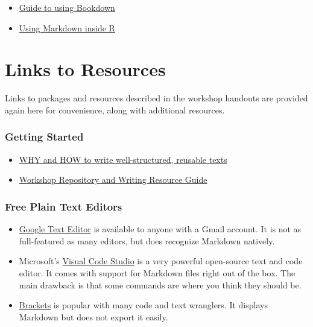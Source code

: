 \documentclass[
]{article}
\providecommand{\tightlist}{%
  \setlength{\itemsep}{0pt}\setlength{\parskip}{0pt}}
\begin{document}
\begin{itemize}
\tightlist
\item
  \href{https://bookdown.org/yihui/bookdown/}{Guide to using Bookdown}
\item
  \href{https://bookdown.org/yihui/rmarkdown/}{Using Markdown inside R}
\end{itemize}

\hypertarget{links-to-resources}{%
\section{Links to Resources}\label{links-to-resources}}

Links to packages and resources described in the workshop handouts are
provided again here for convenience, along with additional resources.

\hypertarget{getting-started}{%
\subsubsection{Getting Started}\label{getting-started}}

\begin{itemize}
\tightlist
\item
  \href{https://www.portent.com/blog/content/content-with-github-markdown.htm}{WHY
  and HOW to write well-structured, reusable texts}
\item
  \href{https://github.com/adanieljohnson/ABLE_2022_Workshop}{Workshop
  Repository and Writing Resource Guide}
\end{itemize}

\hypertarget{free-plain-text-editors}{%
\subsubsection{Free Plain Text Editors}\label{free-plain-text-editors}}

\begin{itemize}
\tightlist
\item
  \href{https://texteditor.co/}{Google Text Editor} is available to
  anyone with a Gmail account. It is not as full-featured as many
  editors, but does recognize Markdown natively.
\item
  Microsoft's \href{https://code.visualstudio.com/}{Visual Code Studio}
  is a very powerful open-source text and code editor. It comes with
  support for Markdown files right out of the box. The main drawback is
  that some commands are where you think they should be.
\item
  \href{https://brackets.io/}{Brackets} is popular with many code and
  text wranglers. It displays Markdown but does not export it easily.
\end{itemize}
\end{document}
